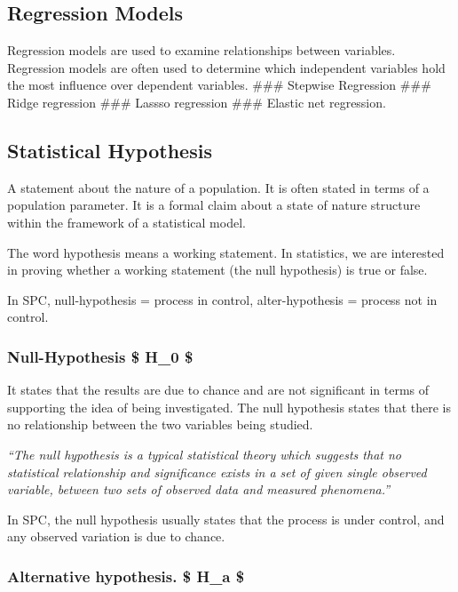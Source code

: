 \documentclass[11pt]{article}
\begin{document}
\hypertarget{regression-models}{%
\subsection{Regression Models}\label{regression-models}}

Regression models are used to examine relationships between variables.
Regression models are often used to determine which independent
variables hold the most influence over dependent variables. \#\#\#
Stepwise Regression \#\#\# Ridge regression \#\#\# Lassso regression
\#\#\# Elastic net regression.

    \hypertarget{statistical-hypothesis}{%
\subsection{Statistical Hypothesis}\label{statistical-hypothesis}}

A statement about the nature of a population. It is often stated in
terms of a population parameter. It is a formal claim about a state of
nature structure within the framework of a statistical model.

The word hypothesis means a working statement. In statistics, we are
interested in proving whether a working statement (the null hypothesis)
is true or false.

In SPC, null-hypothesis = process in control, alter-hypothesis = process
not in control.

\hypertarget{null-hypothesis-h_0}{%
\subsubsection{Null-Hypothesis \$ H\_0 \$}\label{null-hypothesis-h_0}}

It states that the results are due to chance and are not significant in
terms of supporting the idea of being investigated. The null hypothesis
states that there is no relationship between the two variables being
studied.

\emph{``The null hypothesis is a typical statistical theory which
suggests that no statistical relationship and significance exists in a
set of given single observed variable, between two sets of observed data
and measured phenomena.''}

In SPC, the null hypothesis usually states that the process is under
control, and any observed variation is due to chance.

\hypertarget{alternative-hypothesis.-h_a}{%
\subsubsection{Alternative hypothesis. \$ H\_a
\$}\label{alternative-hypothesis.-h_a}}
\end{document}
